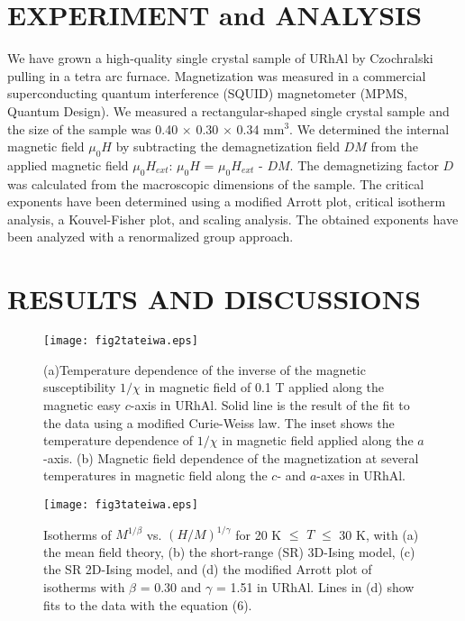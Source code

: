 \documentclass[twocolumn,showpacs,preprintnumbers,amsmath,amssymb]{revtex4}
\begin{document}
 
\section{EXPERIMENT and ANALYSIS}
We have grown a high-quality single crystal sample of URhAl by Czochralski pulling in a tetra arc furnace. Magnetization was measured in a commercial superconducting quantum interference (SQUID) magnetometer (MPMS, Quantum Design). We measured a rectangular-shaped single crystal sample and the size of the sample was 0.40 $\times$ 0.30 $\times$ 0.34 mm$^3$. We determined the internal magnetic field ${{\mu}_0}H$ by subtracting the demagnetization field $DM$ from the applied magnetic field ${{\mu}_0}H_{ext}$: ${{\mu}_0}H$ = ${{\mu}_0}H_{ext}$ - $DM$. The demagnetizing factor $D$ was calculated from the macroscopic dimensions of the sample. The critical exponents have been determined using a modified Arrott plot, critical isotherm analysis, a Kouvel-Fisher plot, and scaling analysis. The obtained exponents have been analyzed with a renormalized group approach.  

\section{RESULTS AND DISCUSSIONS}
      \begin{figure}[t]
\texttt{[image: fig2tateiwa.eps]}%
\caption{\label{fig:epsart}(a)Temperature dependence of the inverse of the magnetic susceptibility $1/{\chi}$ in magnetic field of 0.1 T applied along the magnetic easy $c$-axis in URhAl. Solid line is the result of the fit to the data using a modified Curie-Weiss law. The inset shows the temperature dependence of $1/{\chi}$ in magnetic field applied along the $a$-axis. (b) Magnetic field dependence of the magnetization at several temperatures in magnetic field along the $c$- and $a$-axes in URhAl. }
\end{figure} 

    \begin{figure*}[t]
\texttt{[image: fig3tateiwa.eps]}%
\caption{\label{fig:epsart}Isotherms of $M^{1/{\beta}}$ vs. $(H/M)^{1/{\gamma}}$ for 20 K $\le$ $T$ $\le$ 30 K, with (a) the mean field theory, (b) the short-range (SR) 3D-Ising model, (c) the SR 2D-Ising model, and (d) the modified Arrott plot of isotherms with ${\beta}$ = 0.30 and ${\gamma}$ = 1.51 in URhAl. Lines in (d) show fits to the data with the equation (6).}
\end{figure*} 
\end{document}
